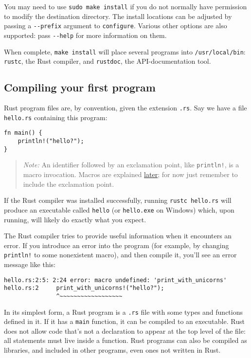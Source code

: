 \documentclass[]{article}
\begin{document}
You may need to use \texttt{sudo make install} if you do not normally
have permission to modify the destination directory. The install
locations can be adjusted by passing a \texttt{-\/-prefix} argument to
\texttt{configure}. Various other options are also supported: pass
\texttt{-\/-help} for more information on them.

When complete, \texttt{make install} will place several programs into
\texttt{/usr/local/bin}: \texttt{rustc}, the Rust compiler, and
\texttt{rustdoc}, the API-documentation tool.

\subsection{Compiling your first
program}\label{compiling-your-first-program}

Rust program files are, by convention, given the extension \texttt{.rs}.
Say we have a file \texttt{hello.rs} containing this program:

\begin{verbatim}
fn main() {
    println!("hello?");
}
\end{verbatim}

\begin{quote}
\emph{Note:} An identifier followed by an exclamation point, like
\texttt{println!}, is a macro invocation. Macros are explained
\hyperref[syntax-extensions]{later}; for now just remember to include
the exclamation point.
\end{quote}

If the Rust compiler was installed successfully, running
\texttt{rustc hello.rs} will produce an executable called \texttt{hello}
(or \texttt{hello.exe} on Windows) which, upon running, will likely do
exactly what you expect.

The Rust compiler tries to provide useful information when it encounters
an error. If you introduce an error into the program (for example, by
changing \texttt{println!} to some nonexistent macro), and then compile
it, you'll see an error message like this:

\begin{verbatim}
hello.rs:2:5: 2:24 error: macro undefined: 'print_with_unicorns'
hello.rs:2     print_with_unicorns!("hello?");
               ^~~~~~~~~~~~~~~~~~~
\end{verbatim}

In its simplest form, a Rust program is a \texttt{.rs} file with some
types and functions defined in it. If it has a \texttt{main} function,
it can be compiled to an executable. Rust does not allow code that's not
a declaration to appear at the top level of the file: all statements
must live inside a function. Rust programs can also be compiled as
libraries, and included in other programs, even ones not written in
Rust.
\end{document}
